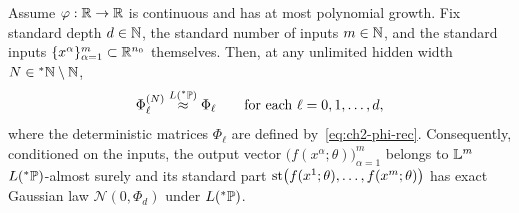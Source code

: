 \begin{theorem}\label{thm:ch2-deep-nngp}
Assume $\varphi : \mathbb{R} \to \mathbb{R}$ is continuous and has at most polynomial growth. Fix standard depth $d \in \mathbb{N}$, the standard number of inputs $m \in \mathbb{N}$, and the standard inputs $\{x^\alpha\}_{\alpha=1}^{m} \subset \mathbb{R}^{n_0}$ themselves. Then, at any unlimited hidden width $N \in {}^*\mathbb{N} \setminus \mathbb{N}$,
\begin{equation}\label{eq:ch2-deep-nngp-conc}
\Phi_\ell^{(N)} \stackrel{L({}^*\mathbb{P})}{\approx} \Phi_\ell \qquad \text{for each } \ell = 0, 1, \dots, d,
\end{equation}
where the deterministic matrices $\Phi_\ell$ are defined by~\eqref{eq:ch2-phi-rec}. Consequently, conditioned on the inputs, the output vector $\bigl(f(x^\alpha; \theta)\bigr)_{\alpha=1}^{m}$ belongs to $\mathbb{L}^m$ $L({}^*\mathbb{P})$-almost surely and its standard part $\operatorname{st}\bigl(f(x^1; \theta), \dots, f(x^m; \theta)\bigr)$ has exact Gaussian law $\mathcal{N}(0, \Phi_d)$ under $L({}^*\mathbb{P})$.
\end{theorem}

